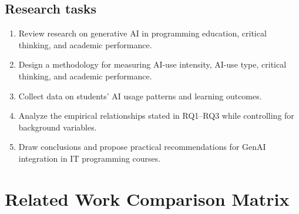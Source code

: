 \documentclass[11pt,a4paper]{article}
\begin{document}
\subsection*{Research tasks}
\begin{enumerate}[leftmargin=*, itemsep=0.15em]
  \item Review research on generative AI in programming education, critical thinking, and academic performance.
  \item Design a methodology for measuring AI-use intensity, AI-use type, critical thinking, and academic performance.
  \item Collect data on students' AI usage patterns and learning outcomes.
  \item Analyze the empirical relationships stated in RQ1--RQ3 while controlling for background variables.
  \item Draw conclusions and propose practical recommendations for GenAI integration in IT programming courses.
\end{enumerate}

\section{Related Work Comparison Matrix}
\end{document}

